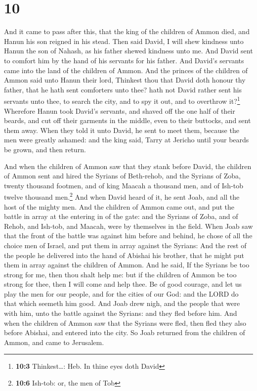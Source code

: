 \hypertarget{section-9}{%
\section{10}\label{section-9}}

 And it came to pass after this, that the king of the
children of Ammon died, and Hanun his son reigned in his stead.
 Then said David, I will shew kindness unto Hanun the son
of Nahash, as his father shewed kindness unto me. And David sent to
comfort him by the hand of his servants for his father. And David's
servants came into the land of the children of Ammon.  And
the princes of the children of Ammon said unto Hanun their lord,
Thinkest thou that David doth honour thy father, that he hath sent
comforters unto thee? hath not David rather sent his servants unto thee,
to search the city, and to spy it out, and to overthrow it?\footnote{\textbf{10:3}
  Thinkest\ldots: Heb. In thine eyes doth David} 
Wherefore Hanun took David's servants, and shaved off the one half of
their beards, and cut off their garments in the middle, even to their
buttocks, and sent them away.  When they told it unto
David, he sent to meet them, because the men were greatly ashamed: and
the king said, Tarry at Jericho until your beards be grown, and then
return.

 And when the children of Ammon saw that they stank before
David, the children of Ammon sent and hired the Syrians of Beth-rehob,
and the Syrians of Zoba, twenty thousand footmen, and of king Maacah a
thousand men, and of Ish-tob twelve thousand men.\footnote{\textbf{10:6}
  Ish-tob: or, the men of Tob}  And when David heard of
it, he sent Joab, and all the host of the mighty men.  And
the children of Ammon came out, and put the battle in array at the
entering in of the gate: and the Syrians of Zoba, and of Rehob, and
Ish-tob, and Maacah, were by themselves in the field. 
When Joab saw that the front of the battle was against him before and
behind, he chose of all the choice men of Israel, and put them in array
against the Syrians:  And the rest of the people he
delivered into the hand of Abishai his brother, that he might put them
in array against the children of Ammon.  And he said, If
the Syrians be too strong for me, then thou shalt help me: but if the
children of Ammon be too strong for thee, then I will come and help
thee.  Be of good courage, and let us play the men for
our people, and for the cities of our God: and the LORD do that which
seemeth him good.  And Joab drew nigh, and the people
that were with him, unto the battle against the Syrians: and they fled
before him.  And when the children of Ammon saw that the
Syrians were fled, then fled they also before Abishai, and entered into
the city. So Joab returned from the children of Ammon, and came to
Jerusalem.


